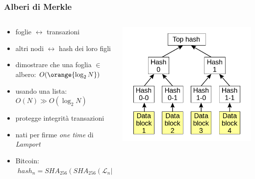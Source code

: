 \begin{frame}
	\frametitle{Alberi di Merkle}
	
\begin{columns}
 \begin{column}{.72\textwidth}

		\begin{itemize}
			\item foglie $\leftrightarrow$ transazioni
			\item altri nodi $\leftrightarrow$ hash dei loro figli
			\item dimostrare che una foglia $\in$ albero: $O(\orange{\log_2 N})$
			\item usando una lista: $O(N) \gg O(\log_2 N)$
			\item protegge integrità transazioni
			\item nati per firme \textit{one time} di \textit{Lamport}
			\item Bitcoin: $\;hash_n=SHA_{256}(SHA_{256}(\mathcal{L}_n|\mathcal{R}_n))$
		\end{itemize}

	\end{column}

	\begin{column}{.4\textwidth}
		\includegraphics[height = 4 cm]{images/merkle.png}
	\end{column}
\end{columns}

\end{frame}